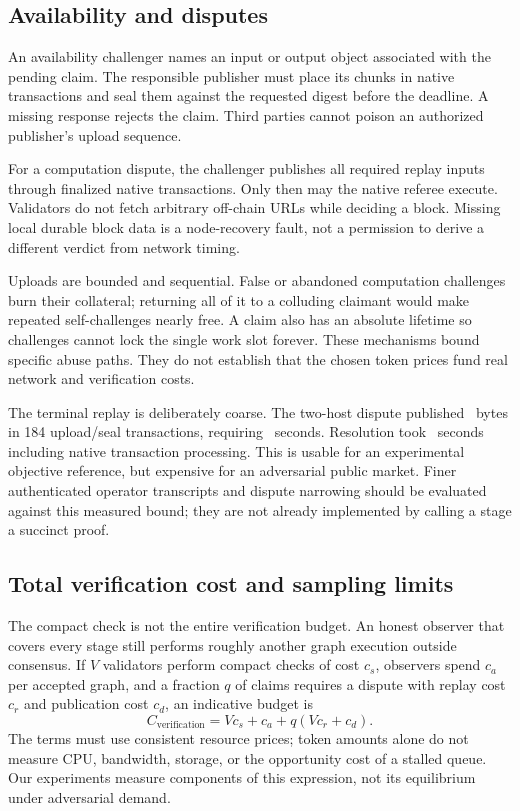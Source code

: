 \documentclass[11pt]{article}
\begin{document}
\subsection{Availability and disputes}
An availability challenger names an input or output object associated with the pending claim. The responsible publisher must place its chunks in native transactions and seal them against the requested digest before the deadline. A missing response rejects the claim. Third parties cannot poison an authorized publisher's upload sequence.

For a computation dispute, the challenger publishes all required replay inputs through finalized native transactions. Only then may the native referee execute. Validators do not fetch arbitrary off-chain URLs while deciding a block. Missing local durable block data is a node-recovery fault, not a permission to derive a different verdict from network timing.

Uploads are bounded and sequential. False or abandoned computation challenges burn their collateral; returning all of it to a colluding claimant would make repeated self-challenges nearly free. A claim also has an absolute lifetime so challenges cannot lock the single work slot forever. These mechanisms bound specific abuse paths. They do not establish that the chosen token prices fund real network and verification costs.

The terminal replay is deliberately coarse. The two-host dispute published \ReplayBytes\ bytes in 184 upload/seal transactions, requiring \UploadSeconds\ seconds. Resolution took \DisputeSeconds\ seconds including native transaction processing. This is usable for an experimental objective reference, but expensive for an adversarial public market. Finer authenticated operator transcripts and dispute narrowing should be evaluated against this measured bound; they are not already implemented by calling a stage a succinct proof.

\subsection{Total verification cost and sampling limits}
The compact check is not the entire verification budget. An honest observer
that covers every stage still performs roughly another graph execution outside
consensus. If $V$ validators perform compact checks of cost $c_s$, observers
spend $c_a$ per accepted graph, and a fraction $q$ of claims requires a dispute
with replay cost $c_r$ and publication cost $c_d$, an indicative budget is
\begin{equation}
 C_{\mathrm{verification}}=V c_s+c_a+q(Vc_r+c_d).
\end{equation}
The terms must use consistent resource prices; token amounts alone do not
measure CPU, bandwidth, storage, or the opportunity cost of a stalled queue.
Our experiments measure components of this expression, not its equilibrium
under adversarial demand.
\end{document}
